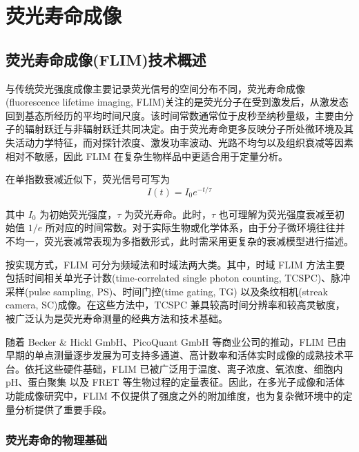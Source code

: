 \chapter{荧光寿命成像}\label{Chap:5}
\section{荧光寿命成像(FLIM)技术概述}\label{5.1}

与传统荧光强度成像主要记录荧光信号的空间分布不同，荧光寿命成像(fluorescence lifetime imaging, FLIM)关注的是荧光分子在受到激发后，从激发态回到基态所经历的平均时间尺度。该时间常数通常位于皮秒至纳秒量级，主要由分子的辐射跃迁与非辐射跃迁共同决定。由于荧光寿命更多反映分子所处微环境及其失活动力学特征，而对探针浓度、激发功率波动、光路不均匀以及组织衰减等因素相对不敏感，因此 FLIM 在复杂生物样品中更适合用于定量分析\cite{RN563}。

在单指数衰减近似下，荧光信号可写为
\begin{equation}
  I(t)=I_0 e^{-t/\tau}
\end{equation}

其中 $I_0$ 为初始荧光强度，$\tau$ 为荧光寿命。此时，$\tau$ 也可理解为荧光强度衰减至初始值 $1/e$ 所对应的时间常数。对于实际生物或化学体系，由于分子微环境往往并不均一，荧光衰减常表现为多指数形式，此时需采用更复杂的衰减模型进行描述\cite{RN2036}。

按实现方式，FLIM 可分为频域法和时域法两大类\cite{RN1623}。其中，时域 FLIM 方法主要包括时间相关单光子计数(time-correlated single photon counting, TCSPC)、脉冲采样(pulse sampling, PS)\cite{RN2118}、时间门控(time gating, TG)\cite{RN2120} 以及条纹相机(streak camera, SC)成像\cite{RN568,RN2075}。在这些方法中，TCSPC 兼具较高时间分辨率和较高灵敏度，被广泛认为是荧光寿命测量的经典方法和技术基础。

随着 Becker \& Hickl GmbH、PicoQuant GmbH 等商业公司的推动，FLIM 已由早期的单点测量逐步发展为可支持多通道、高计数率和活体实时成像的成熟技术平台\cite{RN1656,RN897,RN2050,RN2049}。依托这些硬件基础，FLIM 已被广泛用于温度\cite{RN2037,RN127}、离子浓度\cite{RN2038}、氧浓度\cite{RN2040}、细胞内 pH\cite{RN2042}、蛋白聚集\cite{RN2041} 以及 FRET \cite{RN913,RN1809,RN247} 等生物过程的定量表征。因此，在多光子成像和活体功能成像研究中，FLIM 不仅提供了强度之外的附加维度，也为复杂微环境中的定量分析提供了重要手段。



\subsection{荧光寿命的物理基础}\label{5.1.1}

